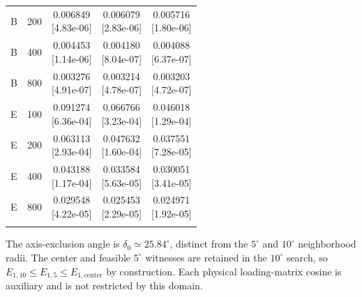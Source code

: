 \documentclass[12pt,letterpaper]{article}
\theoremstyle{plain}
\theoremstyle{definition}
\begin{document}
\begin{table}[p]
\begin{adjustbox}{max width=\linewidth}
\begin{tabular}{lrccc}
B & 200 & \shortstack{0.006849\\[-1pt]{\scriptsize[4.83e-06]}} & \shortstack{0.006079\\[-1pt]{\scriptsize[2.83e-06]}} & \shortstack{0.005716\\[-1pt]{\scriptsize[1.80e-06]}}\\
B & 400 & \shortstack{0.004453\\[-1pt]{\scriptsize[1.14e-06]}} & \shortstack{0.004180\\[-1pt]{\scriptsize[8.04e-07]}} & \shortstack{0.004088\\[-1pt]{\scriptsize[6.37e-07]}}\\
B & 800 & \shortstack{0.003276\\[-1pt]{\scriptsize[4.91e-07]}} & \shortstack{0.003214\\[-1pt]{\scriptsize[4.78e-07]}} & \shortstack{0.003203\\[-1pt]{\scriptsize[4.72e-07]}}\\
\addlinespace
E & 100 & \shortstack{0.091274\\[-1pt]{\scriptsize[6.36e-04]}} & \shortstack{0.066766\\[-1pt]{\scriptsize[3.23e-04]}} & \shortstack{0.046018\\[-1pt]{\scriptsize[1.29e-04]}}\\
E & 200 & \shortstack{0.063113\\[-1pt]{\scriptsize[2.93e-04]}} & \shortstack{0.047632\\[-1pt]{\scriptsize[1.60e-04]}} & \shortstack{0.037551\\[-1pt]{\scriptsize[7.28e-05]}}\\
E & 400 & \shortstack{0.043188\\[-1pt]{\scriptsize[1.17e-04]}} & \shortstack{0.033584\\[-1pt]{\scriptsize[5.63e-05]}} & \shortstack{0.030051\\[-1pt]{\scriptsize[3.41e-05]}}\\
E & 800 & \shortstack{0.029548\\[-1pt]{\scriptsize[4.22e-05]}} & \shortstack{0.025453\\[-1pt]{\scriptsize[2.29e-05]}} & \shortstack{0.024971\\[-1pt]{\scriptsize[1.92e-05]}}\\
\addlinespace
\bottomrule
\end{tabular}
\end{adjustbox}
\par\smallskip
\begin{minipage}{0.98\linewidth}\footnotesize
The axis-exclusion angle is $\delta_0\simeq25.84^\circ$, distinct from the $5^\circ$ and $10^\circ$ neighborhood radii. The center and feasible $5^\circ$ witnesses are retained in the $10^\circ$ search, so $E_{1,10}\le E_{1,5}\le E_{1,\mathrm{center}}$ by construction. Each physical loading-matrix cosine is auxiliary and is not restricted by this domain.
\end{minipage}
\endgroup
\end{table}
\end{document}
